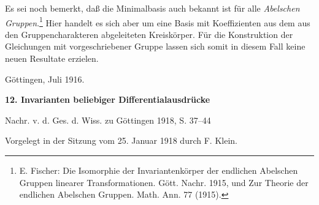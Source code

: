 \documentclass[11pt]{article}
\begin{document}
Es sei noch bemerkt, daß die Minimalbasis auch bekannt ist für alle \emph{Abelschen Gruppen}.\footnote{E. Fischer: Die Isomorphie der Invariantenkörper der endlichen Abelschen Gruppen linearer Transformationen. Gött. Nachr. 1915, und Zur Theorie der endlichen Abelschen Gruppen. Math. Ann. 77 (1915).} Hier handelt es sich aber um eine Basis mit Koeffizienten aus dem aus den Gruppencharakteren abgeleiteten Kreiskörper. Für die Konstruktion der Gleichungen mit vorgeschriebener Gruppe lassen sich somit in diesem Fall keine neuen Resultate erzielen.

Göttingen, Juli 1916.

\clearpage
\providecommand{\bdelta}{\bar{\delta}}
\begin{center}
{\Large\bfseries 12. Invarianten beliebiger Differentialausdrücke}\par
\vspace{1.5em}
Nachr. v. d. Ges. d. Wiss. zu Göttingen 1918, S. 37--44
\end{center}

\vspace{3em}
\begin{center}
Vorgelegt in der Sitzung vom 25. Januar 1918 durch F. Klein.
\end{center}
\end{document}
